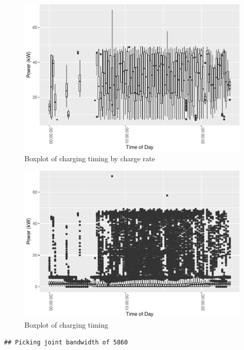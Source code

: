 \documentclass[]{article}
\begin{document}
\begin{figure}
\centering
\includegraphics{EVBB_report_files/figure-latex/plot3-1.pdf}
\caption{\label{fig:plot3}Boxplot of charging timing by charge rate}
\end{figure}

\begin{figure}
\centering
\includegraphics{EVBB_report_files/figure-latex/plot2-1.pdf}
\caption{\label{fig:plot2}Boxplot of charging timing}
\end{figure}

\begin{verbatim}
## Picking joint bandwidth of 5860
\end{verbatim}
\end{document}
